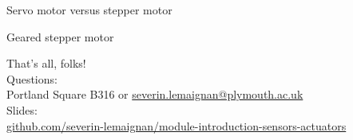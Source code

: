 \documentclass[compress]{beamer}
\begin{document}

{
    \begin{frame}{Servo motor versus stepper motor}
    \end{frame}
}

{
    \begin{frame}{Geared stepper motor}
    \end{frame}
}


\begin{frame}{}
    \begin{center}
        \Large
        That's all, folks!\\[2em]
        \normalsize
        Questions:\\
        Portland Square B316 or \url{severin.lemaignan@plymouth.ac.uk} \\[1em]

        Slides:\\
        \href{https://github.com/severin-lemaignan/module-introduction-sensors-actuators}{\small
        github.com/severin-lemaignan/module-introduction-sensors-actuators}


    \end{center}
\end{frame}
\end{document}
